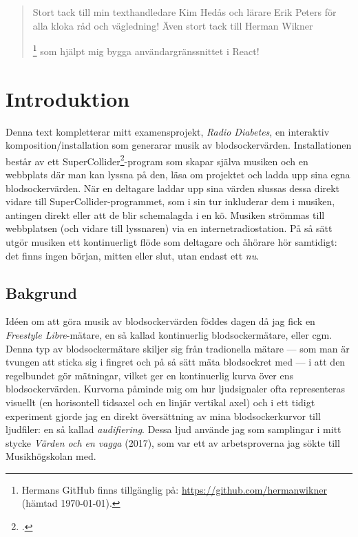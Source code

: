 \documentclass[11pt, a4paper]{article} %
\newcommand{\symfootnote}[1]{%
\let\oldthefootnote=\thefootnote%
\stepcounter{mpfootnote}%
\addtocounter{footnote}{-1}%
\renewcommand{\thefootnote}{$\dagger$}%
\footnote{#1}%
\let\thefootnote=\oldthefootnote%
}
\begin{document}
\clearpage


\newpage

\renewcommand{\abstractname}{Tack}
\begin{abstract}
  Stort tack till min texthandledare Kim Hedås och lärare Erik Peters för alla kloka råd och vägledning! Även stort tack till Herman Wikner\symfootnote{Hermans GitHub finns tillgänglig på: \url{https://github.com/hermanwikner} (hämtad \today).} som hjälpt mig bygga användargränssnittet i React! 
\end{abstract}
\tableofcontents
\clearpage

\section*{Introduktion}
Denna text kompletterar mitt examensprojekt, \emph{Radio Diabetes}, en interaktiv komposition/installation som generarar musik av blodsockervärden. Installationen består av ett SuperCollider\footcite{noauthor_supercollider_nodate}-program som skapar själva musiken och en webbplats där man kan lyssna på den, läsa om projektet och ladda upp sina egna blodsockervärden. När en deltagare laddar upp sina värden slussas dessa direkt vidare till SuperCollider-programmet, som i sin tur inkluderar dem i musiken, antingen direkt eller att de blir schemalagda i en kö. Musiken strömmas till webbplatsen (och vidare till lyssnaren) via en internetradiostation. På så sätt utgör musiken ett kontinuerligt flöde som deltagare och åhörare hör samtidigt: det finns ingen början, mitten eller slut, utan endast ett \emph{nu}. %



\subsection*{Bakgrund}
Idéen om att göra musik av blodsockervärden föddes dagen då jag fick en \emph{Freestyle Libre}-mätare, en så kallad kontinuerlig blodsockermätare, eller \gls{cgm}. Denna typ av blodsockermätare skiljer sig från tradionella mätare --- som man är tvungen att sticka sig i fingret och på så sätt mäta blodsockret med --- i att den regelbundet gör mätningar, vilket ger en kontinuerlig kurva över ens blodsockervärden. Kurvorna påminde mig om hur ljudsignaler ofta representeras visuellt (en horisontell tidsaxel och en linjär vertikal axel) och i ett tidigt experiment gjorde jag en direkt översättning av mina blodsockerkurvor till ljudfiler: en så kallad \emph{audifiering}. Dessa ljud använde jag som samplingar i mitt stycke \emph{Värden och en vagga} (2017), som var ett av arbetsproverna jag sökte till Musikhögskolan med. 
\end{document}
